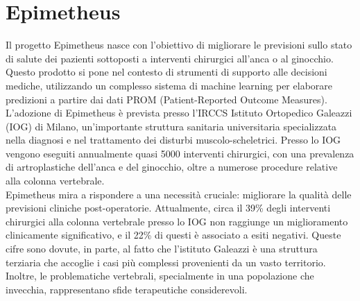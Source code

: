 \chapter{Epimetheus}
\label{cap:epimetheus}

Il progetto Epimetheus nasce con l'obiettivo di migliorare le previsioni sullo stato di salute dei pazienti sottoposti a interventi chirurgici all'anca o al ginocchio. Questo prodotto si pone nel contesto di strumenti di supporto alle decisioni mediche, utilizzando un complesso sistema di machine learning per elaborare predizioni a partire dai dati PROM (Patient-Reported Outcome Measures).\\
L'adozione di Epimetheus è prevista presso l'IRCCS Istituto Ortopedico Galeazzi (IOG) di Milano, un'importante struttura sanitaria universitaria specializzata nella diagnosi e nel trattamento dei disturbi muscolo-scheletrici. Presso lo IOG vengono eseguiti annualmente quasi 5000 interventi chirurgici, con una prevalenza di artroplastiche dell'anca e del ginocchio, oltre a numerose procedure relative alla colonna vertebrale.\\
Epimetheus mira a rispondere a una necessità cruciale: migliorare la qualità delle previsioni cliniche post-operatorie. Attualmente, circa il 39\% degli interventi chirurgici alla colonna vertebrale presso lo IOG non raggiunge un miglioramento clinicamente significativo, e il 22\% di questi è associato a esiti negativi. Queste cifre sono dovute, in parte, al fatto che l'istituto Galeazzi è una struttura terziaria che accoglie i casi più complessi provenienti da un vasto territorio. Inoltre, le problematiche vertebrali, specialmente in una popolazione che invecchia, rappresentano sfide terapeutiche considerevoli.\\

